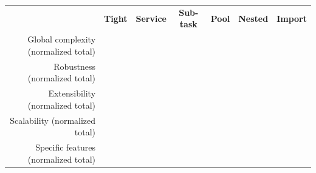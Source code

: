 \documentclass[preprint,3p,twocolumn]{elsarticle}
\begin{document}
\begin{table}
\footnotesize
\centering
\begin{tabular}{rcccccc}
                                    & \textbf{Tight}
                                    & \textbf{Service}
                                    & \textbf{Sub-task}
                                    & \textbf{Pool}
                                    & \textbf{Nested}
                                    & \textbf{Import} \\
  Global complexity (normalized total) &
                                    \cellcolor[HTML]{99FF99}{0.00}
                                    & \cellcolor[HTML]{99E899}{0.22}
                                    & \cellcolor[HTML]{99FF99}{0.00}
                                    & \cellcolor[HTML]{99D199}{0.44}
                                    & \cellcolor[HTML]{999999}{1.00}
                                      & \cellcolor[HTML]{99DD99}{0.33}\\
Robustness (normalized total) &
                                \cellcolor[HTML]{99F099}{0.14}
                                    & \cellcolor[HTML]{99D399}{0.43}
                                    & \cellcolor[HTML]{99FF99}{0.00}
                                    & \cellcolor[HTML]{99B699}{0.71}
                                    & \cellcolor[HTML]{999999}{1.00}
                                    & \cellcolor[HTML]{99D399}{0.43}\\
  Extensibility (normalized total)  & \cellcolor[HTML]{99D199}{0.44}
                                     & \cellcolor[HTML]{99D199}{0.44}
                                     & \cellcolor[HTML]{99FF99}{0.00}
                                     & \cellcolor[HTML]{99E899}{0.22}
                                     & \cellcolor[HTML]{999999}{1.00}
                                     & \cellcolor[HTML]{99E899}{0.22}\\
Scalability (normalized total)  & \cellcolor[HTML]{999999}{1.00}
                                     & \cellcolor[HTML]{99CC99}{0.50}
                                     & \cellcolor[HTML]{99CC99}{0.50}
                                     & \cellcolor[HTML]{99FF99}{0.00}
                                     & \cellcolor[HTML]{99CC99}{0.50}
                                     & \cellcolor[HTML]{99CC99}{0.50}\\
Specific features (normalized total) & \cellcolor[HTML]{99CC99}{0.50}
                                     & \cellcolor[HTML]{99CC99}{0.50}
                                     & \cellcolor[HTML]{999999}{1.00}

\end{tabular}
\end{table}
\end{document}

